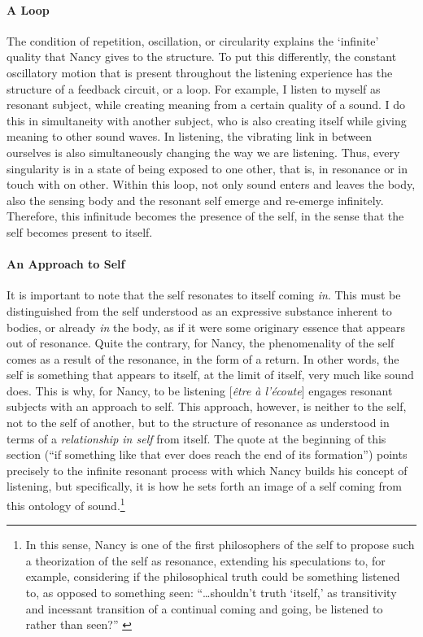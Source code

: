 \paragraph{A Loop}
The condition of repetition, oscillation, or circularity explains the `infinite' quality that Nancy gives to the structure. To put this differently, the constant oscillatory motion that is present throughout the listening experience has the structure of a feedback circuit, or a loop. For example, I listen to myself as resonant subject, while creating meaning from a certain quality of a sound. I do this in simultaneity with another subject, who is also creating itself while giving meaning to other sound waves. In listening, the vibrating link in between ourselves is also simultaneously changing the way we are listening. Thus, every singularity is in a state of being exposed to one other, that is, in resonance or in touch with on other. Within this loop, not only sound enters and leaves the body, also the sensing body and the resonant self emerge and re-emerge infinitely. Therefore, this infinitude becomes the presence of the self, in the sense that the self becomes present to itself. 

\paragraph{An Approach to Self}
It is important to note that the self resonates to itself coming \textit{in}. This must be distinguished from the self understood as an expressive substance inherent to bodies, or already \textit{in} the body, as if it were some originary essence that appears out of resonance. Quite the contrary, for Nancy, the phenomenality of the self comes as a result of the resonance, in the form of a return. In other words, the self is something that appears to itself, at the limit of itself, very much like sound does. This is why, for Nancy, to be listening [\textit{être à l'écoute}] engages resonant subjects with an approach to self. This approach, however, is neither to the self, not to the self of another, but to the structure of resonance as understood in terms of a \textit{relationship in self} from itself. The quote at the beginning of this section (``if something like that ever does reach the end of its formation'') points precisely to the infinite resonant process with which Nancy builds his concept of listening, but specifically, it is how he sets forth an image of a self coming from this ontology of sound.\footnote{In this sense, Nancy is one of the first philosophers of the self to propose such a theorization of the self as resonance, extending his speculations to, for example, considering if the philosophical truth could be something listened to, as opposed to something seen: ``\dots shouldn't truth `itself,' as transitivity and incessant transition of a continual coming and going, be listened to rather than seen?'' \parencite[4]{Nan07:Lis}}

